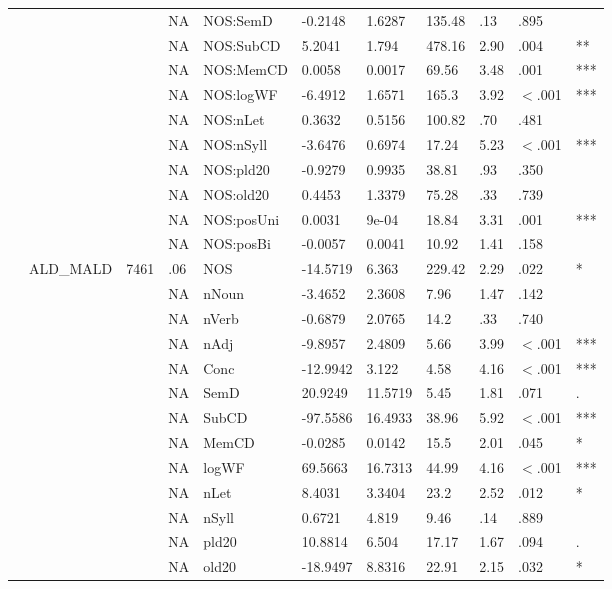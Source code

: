 \begin{table}[ht]
\begin{tabular}{lllllllllll}
   &  &  & NA & NOS:SemD & -0.2148 & 1.6287 & 135.48 & .13 & .895 &   \\ 
   &  &  & NA & NOS:SubCD & 5.2041 & 1.794 & 478.16 & 2.90 & .004 & ** \\ 
   &  &  & NA & NOS:MemCD & 0.0058 & 0.0017 & 69.56 & 3.48 & .001 & *** \\ 
   &  &  & NA & NOS:logWF & -6.4912 & 1.6571 & 165.3 & 3.92 & $<$.001 & *** \\ 
   &  &  & NA & NOS:nLet & 0.3632 & 0.5156 & 100.82 & .70 & .481 &   \\ 
   &  &  & NA & NOS:nSyll & -3.6476 & 0.6974 & 17.24 & 5.23 & $<$.001 & *** \\ 
   &  &  & NA & NOS:pld20 & -0.9279 & 0.9935 & 38.81 & .93 & .350 &   \\ 
   &  &  & NA & NOS:old20 & 0.4453 & 1.3379 & 75.28 & .33 & .739 &   \\ 
   &  &  & NA & NOS:posUni & 0.0031 & 9e-04 & 18.84 & 3.31 & .001 & *** \\ 
   &  &  & NA & NOS:posBi & -0.0057 & 0.0041 & 10.92 & 1.41 & .158 &   \\ 
   & ALD\_MALD & 7461 & .06 & NOS & -14.5719 & 6.363 & 229.42 & 2.29 & .022 & * \\ 
   &  &  & NA & nNoun & -3.4652 & 2.3608 & 7.96 & 1.47 & .142 &   \\ 
   &  &  & NA & nVerb & -0.6879 & 2.0765 & 14.2 & .33 & .740 &   \\ 
   &  &  & NA & nAdj & -9.8957 & 2.4809 & 5.66 & 3.99 & $<$.001 & *** \\ 
   &  &  & NA & Conc & -12.9942 & 3.122 & 4.58 & 4.16 & $<$.001 & *** \\ 
   &  &  & NA & SemD & 20.9249 & 11.5719 & 5.45 & 1.81 & .071 & . \\ 
   &  &  & NA & SubCD & -97.5586 & 16.4933 & 38.96 & 5.92 & $<$.001 & *** \\ 
   &  &  & NA & MemCD & -0.0285 & 0.0142 & 15.5 & 2.01 & .045 & * \\ 
   &  &  & NA & logWF & 69.5663 & 16.7313 & 44.99 & 4.16 & $<$.001 & *** \\ 
   &  &  & NA & nLet & 8.4031 & 3.3404 & 23.2 & 2.52 & .012 & * \\ 
   &  &  & NA & nSyll & 0.6721 & 4.819 & 9.46 & .14 & .889 &   \\ 
   &  &  & NA & pld20 & 10.8814 & 6.504 & 17.17 & 1.67 & .094 & . \\ 
   &  &  & NA & old20 & -18.9497 & 8.8316 & 22.91 & 2.15 & .032 & * \\ 

\end{tabular}
\end{table}
